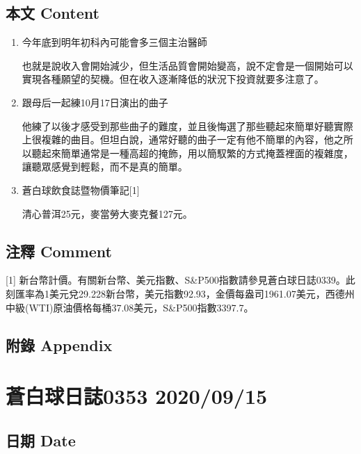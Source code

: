 \documentclass[a5paper, 11pt
]{book}
\begin{document}
\hypertarget{ux672cux6587-content-13}{%
\subsection{本文 Content}\label{ux672cux6587-content-13}}

\begin{enumerate}
\def\labelenumi{\arabic{enumi}.}
\item
  今年底到明年初科內可能會多三個主治醫師

  也就是說收入會開始減少，但生活品質會開始變高，說不定會是一個開始可以實現各種願望的契機。但在收入逐漸降低的狀況下投資就要多注意了。
\item
  跟母后一起練10月17日演出的曲子

  他練了以後才感受到那些曲子的難度，並且後悔選了那些聽起來簡單好聽實際上很複雜的曲目。但坦白說，通常好聽的曲子一定有他不簡單的內容，他之所以聽起來簡單通常是一種高超的掩飾，用以簡馭繁的方式掩蓋裡面的複雜度，讓聽眾感覺到輕鬆，而不是真的簡單。
\item
  蒼白球飲食誌暨物價筆記{[}1{]}

  清心普洱25元，麥當勞大麥克餐127元。
\end{enumerate}

\hypertarget{ux6ce8ux91cb-comment-13}{%
\subsection{注釋 Comment}\label{ux6ce8ux91cb-comment-13}}

{[}1{]}
新台幣計價。有關新台幣、美元指數、S\&P500指數請參見蒼白球日誌0339。此刻匯率為1美元兌29.228新台幣，美元指數92.93，金價每盎司1961.07美元，西德州中級(WTI)原油價格每桶37.08美元，S\&P500指數3397.7。

\hypertarget{ux9644ux9304-appendix-13}{%
\subsection{附錄 Appendix}\label{ux9644ux9304-appendix-13}}

\hypertarget{ux84bcux767dux7403ux65e5ux8a8c0353-20200915}{%
\section{蒼白球日誌0353
2020/09/15}\label{ux84bcux767dux7403ux65e5ux8a8c0353-20200915}}

\hypertarget{ux65e5ux671f-date-14}{%
\subsection{日期 Date}\label{ux65e5ux671f-date-14}}
\end{document}
